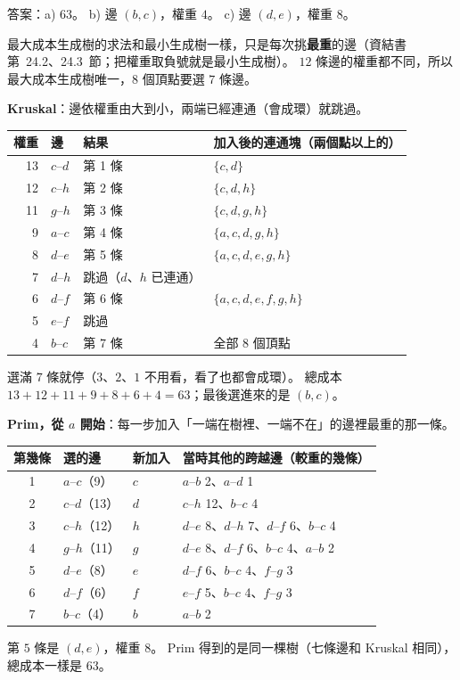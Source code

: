 \begin{pastsoln}
答案：a) $63$。 b) 邊 $(b, c)$，權重 $4$。 c) 邊 $(d, e)$，權重 $8$。

最大成本生成樹的求法和最小生成樹一樣，只是每次挑\textbf{最重}的邊（資結書第~24.2、24.3~節；把權重取負號就是最小生成樹）。
$12$ 條邊的權重都不同，所以最大成本生成樹唯一，$8$ 個頂點要選 $7$ 條邊。

\textbf{Kruskal}：邊依權重由大到小，兩端已經連通（會成環）就跳過。
\begin{center}
\small
\begin{tabular}{rlll}
\toprule
權重 & 邊 & 結果 & 加入後的連通塊（兩個點以上的） \\
\midrule
13 & $c$--$d$ & 第 1 條 & $\{c, d\}$ \\
12 & $c$--$h$ & 第 2 條 & $\{c, d, h\}$ \\
11 & $g$--$h$ & 第 3 條 & $\{c, d, g, h\}$ \\
9 & $a$--$c$ & 第 4 條 & $\{a, c, d, g, h\}$ \\
8 & $d$--$e$ & 第 5 條 & $\{a, c, d, e, g, h\}$ \\
7 & $d$--$h$ & 跳過（$d$、$h$ 已連通） & \\
6 & $d$--$f$ & 第 6 條 & $\{a, c, d, e, f, g, h\}$ \\
5 & $e$--$f$ & 跳過 & \\
4 & $b$--$c$ & 第 7 條 & 全部 $8$ 個頂點 \\
\bottomrule
\end{tabular}
\end{center}
選滿 $7$ 條就停（$3$、$2$、$1$ 不用看，看了也都會成環）。 總成本 $13 + 12 + 11 + 9 + 8 + 6 + 4 = 63$；最後選進來的是 $(b, c)$。

\textbf{Prim，從 $a$ 開始}：每一步加入「一端在樹裡、一端不在」的邊裡最重的那一條。
\begin{center}
\small
\begin{tabular}{clll}
\toprule
第幾條 & 選的邊 & 新加入 & 當時其他的跨越邊（較重的幾條） \\
\midrule
1 & $a$--$c$（9） & $c$ & $a$--$b$ 2、$a$--$d$ 1 \\
2 & $c$--$d$（13） & $d$ & $c$--$h$ 12、$b$--$c$ 4 \\
3 & $c$--$h$（12） & $h$ & $d$--$e$ 8、$d$--$h$ 7、$d$--$f$ 6、$b$--$c$ 4 \\
4 & $g$--$h$（11） & $g$ & $d$--$e$ 8、$d$--$f$ 6、$b$--$c$ 4、$a$--$b$ 2 \\
5 & $d$--$e$（8） & $e$ & $d$--$f$ 6、$b$--$c$ 4、$f$--$g$ 3 \\
6 & $d$--$f$（6） & $f$ & $e$--$f$ 5、$b$--$c$ 4、$f$--$g$ 3 \\
7 & $b$--$c$（4） & $b$ & $a$--$b$ 2 \\
\bottomrule
\end{tabular}
\end{center}
第 $5$ 條是 $(d, e)$，權重 $8$。 Prim 得到的是同一棵樹（七條邊和 Kruskal 相同），總成本一樣是 $63$。
\end{pastsoln}
